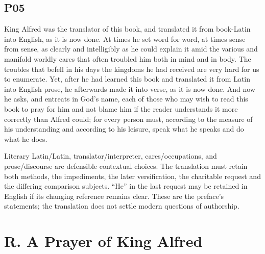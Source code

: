 \subsection*{P05}

\par\begin{minipage}{\linewidth}\raggedright
King Alfred was the translator of this book, and translated it from book-Latin into English, as it is now done. At times he set word for word, at times sense from sense, as clearly and intelligibly as he could explain it amid the various and manifold worldly cares that often troubled him both in mind and in body. The troubles that befell in his days the kingdoms he had received are very hard for us to enumerate. Yet, after he had learned this book and translated it from Latin into English prose, he afterwards made it into verse, as it is now done. And now he asks, and entreats in God’s name, each of those who may wish to read this book to pray for him and not blame him if the reader understands it more correctly than Alfred could; for every person must, according to the measure of his understanding and according to his leisure, speak what he speaks and do what he does.

Literary Latin/\allowbreak{}Latin, translator/\allowbreak{}interpreter, cares/\allowbreak{}occupations, and prose/\allowbreak{}discourse are defensible contextual choices. The translation must retain both methods, the impediments, the later versification, the charitable request and the differing comparison subjects. “He” in the last request may be retained in English if its changing reference remains clear. These are the preface’s statements; the translation does not settle modern questions of authorship.

\end{minipage}\par\addvspace{4pt}

\section*{R. A Prayer of King Alfred}

